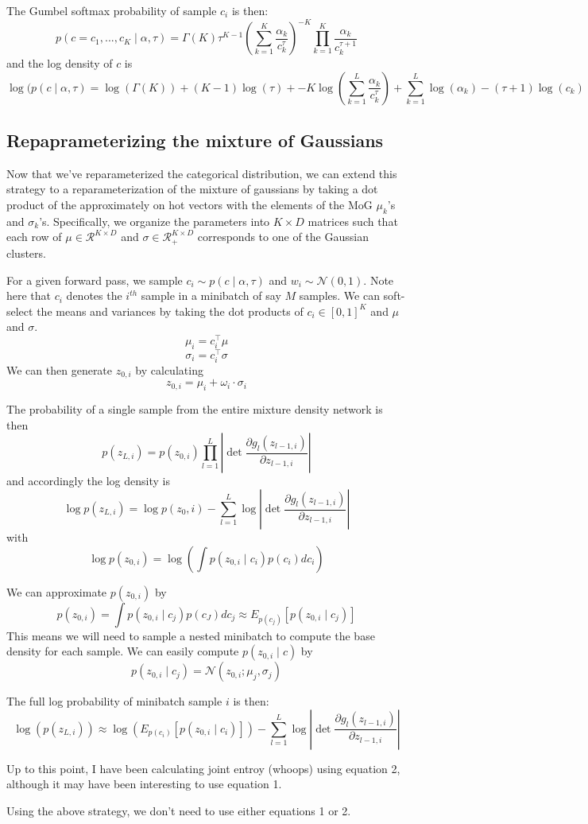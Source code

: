 \documentclass[11pt]{article}
\begin{document}
The Gumbel softmax probability of sample $c_i$ is then:
\[p(c = c_1, ..., c_K \mid \alpha, \tau) = \Gamma(K) \tau^{K-1} \left( \sum_{k=1}^K \frac{\alpha_k}{c_k^\tau} \right)^{-K} \prod_{k=1}^K \frac{\alpha_k}{c_k^{\tau + 1}} \]
and the log density of $c$ is
\begin{equation}
\log(p(c \mid \alpha, \tau) = \log (\Gamma (K)) + (K-1) \log(\tau) + -K \log \left( \sum_{k=1}^L \frac{\alpha_k}{c_k^\tau} \right)+ \sum_{k=1}^L \log(\alpha_k) - (\tau + 1) \log(c_k)
\end{equation}
\subsection{Repaprameterizing the mixture of Gaussians}
Now that we've reparameterized the categorical distribution, we can extend this strategy to a reparameterization of the mixture of gaussians by taking a dot product of the approximately on hot vectors with the elements of the MoG $\mu_k$'s and $\sigma_k$'s.  Specifically, we organize the parameters into $K \times D$ matrices such that each row of $\mu \in \mathcal{R}^{K \times D}$ and $\sigma \in \mathcal{R}^{K \times D}_+$ corresponds to one of the Gaussian clusters.

For a given forward pass, we sample $c_i \sim p(c \mid \alpha, \tau)$ and $w_i \sim \mathcal{N}(0, 1)$.  Note here that $c_i$ denotes the $i^{th}$ sample in a minibatch of say $M$ samples.  We can soft-select the means and variances by taking the dot products of $c_i \in [0,1]^K$ and $\mu$ and $\sigma$.
\[\mu_i = c_i^\top \mu \]
\[\sigma_i = c_i^\top \sigma \]
We can then generate $z_{0, i}$ by calculating
\[z_{0,i} = \mu_i + \omega_i \cdot \sigma_i \]

The probability of a single sample from the entire mixture density network is then
\[p(z_{L,i}) = p(z_{0,i})  \prod_{l=1}^L \left| \det \frac{\partial g_l(z_{l-1,i})}{\partial z_{l-1,i}} \right| \]
and accordingly the log density is
\[\log p(z_{L,i}) = \log p(z_0,i) - \sum_{l=1}^L \log \left| \det \frac{\partial g_l(z_{l-1,i})}{\partial z_{l-1,i}} \right| \]
with
\[\log p(z_{0,i}) = \log \left( \int p(z_{0,i} \mid c_i) p(c_i) d c_i \right) \]

We can approximate $p(z_{0,i})$ by
\[p(z_{0,i}) =  \int p(z_{0,i} \mid c_j) p(c_J) d c_j \approx E_{p(c_j)} \left[p(z_{0,i} \mid c_j) \right] \]
This means we will need to sample a nested minibatch to compute the base density for each sample.  We can easily compute $p(z_{0,i} \mid c)$ by
 \[ p(z_{0,i} \mid c_j) = \mathcal{N}(z_{0,i}; \mu_j, \sigma_j)\]

The full log probability of minibatch sample $i$ is then:
\[\log( p (z_{L,i})) \approx \log \left(  E_{p(c_i)} \left[p(z_{0,i} \mid c_i) \right] \right) - \sum_{l=1}^L \log \left| \det \frac{\partial g_l(z_{l-1,i})}{\partial z_{l-1,i}} \right| \]

Up to this point, I have been calculating joint entroy (whoops) using equation 2, although it may have been interesting to use equation 1.

Using the above strategy, we don't need to use either equations 1 or 2.



\end{document}

